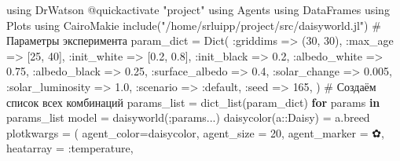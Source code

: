 \documentclass[
  english,
  russian,
  12pt,
  a4paper,
  DIV=11,
  numbers=noendperiod]{scrreprt}
\newenvironment{Shaded}{\begin{snugshade}}{\end{snugshade}}
\newcommand{\BuiltInTok}[1]{\textcolor[rgb]{0.00,0.23,0.31}{#1}}
\newcommand{\CharTok}[1]{\textcolor[rgb]{0.13,0.47,0.30}{#1}}
\newcommand{\CommentTok}[1]{\textcolor[rgb]{0.37,0.37,0.37}{#1}}
\newcommand{\ControlFlowTok}[1]{\textcolor[rgb]{0.00,0.23,0.31}{\textbf{#1}}}
\newcommand{\DataTypeTok}[1]{\textcolor[rgb]{0.68,0.00,0.00}{#1}}
\newcommand{\FloatTok}[1]{\textcolor[rgb]{0.68,0.00,0.00}{#1}}
\newcommand{\FunctionTok}[1]{\textcolor[rgb]{0.28,0.35,0.67}{#1}}
\newcommand{\ImportTok}[1]{\textcolor[rgb]{0.00,0.46,0.62}{#1}}
\newcommand{\KeywordTok}[1]{\textcolor[rgb]{0.00,0.23,0.31}{\textbf{#1}}}
\newcommand{\NormalTok}[1]{\textcolor[rgb]{0.00,0.23,0.31}{#1}}
\newcommand{\OperatorTok}[1]{\textcolor[rgb]{0.37,0.37,0.37}{#1}}
\newcommand{\PreprocessorTok}[1]{\textcolor[rgb]{0.68,0.00,0.00}{#1}}
\newcommand{\StringTok}[1]{\textcolor[rgb]{0.13,0.47,0.30}{#1}}
\begin{document}
\begin{Shaded}
\begin{Highlighting}[]
\ImportTok{using} \BuiltInTok{DrWatson}
\PreprocessorTok{@quickactivate} \StringTok{"project"}
\ImportTok{using} \BuiltInTok{Agents}
\ImportTok{using} \BuiltInTok{DataFrames}
\ImportTok{using} \BuiltInTok{Plots}
\ImportTok{using} \BuiltInTok{CairoMakie}
\FunctionTok{include}\NormalTok{(}\StringTok{"/home/srluipp/project/src/daisyworld.jl"}\NormalTok{)}
\CommentTok{\# Параметры эксперимента}
\NormalTok{param\_dict }\OperatorTok{=} \FunctionTok{Dict}\NormalTok{(}
\OperatorTok{:}\NormalTok{griddims }\OperatorTok{=\textgreater{}}\NormalTok{ (}\FloatTok{30}\NormalTok{, }\FloatTok{30}\NormalTok{),}
\OperatorTok{:}\NormalTok{max\_age }\OperatorTok{=\textgreater{}}\NormalTok{ [}\FloatTok{25}\NormalTok{, }\FloatTok{40}\NormalTok{],}
\OperatorTok{:}\NormalTok{init\_white }\OperatorTok{=\textgreater{}}\NormalTok{ [}\FloatTok{0.2}\NormalTok{, }\FloatTok{0.8}\NormalTok{],}
\OperatorTok{:}\NormalTok{init\_black }\OperatorTok{=\textgreater{}} \FloatTok{0.2}\NormalTok{,}
\OperatorTok{:}\NormalTok{albedo\_white }\OperatorTok{=\textgreater{}} \FloatTok{0.75}\NormalTok{,}
\OperatorTok{:}\NormalTok{albedo\_black }\OperatorTok{=\textgreater{}} \FloatTok{0.25}\NormalTok{,}
\OperatorTok{:}\NormalTok{surface\_albedo }\OperatorTok{=\textgreater{}} \FloatTok{0.4}\NormalTok{,}
\OperatorTok{:}\NormalTok{solar\_change }\OperatorTok{=\textgreater{}} \FloatTok{0.005}\NormalTok{,}
\OperatorTok{:}\NormalTok{solar\_luminosity }\OperatorTok{=\textgreater{}} \FloatTok{1.0}\NormalTok{,}
\OperatorTok{:}\NormalTok{scenario }\OperatorTok{=\textgreater{}} \OperatorTok{:}\NormalTok{default,}
\OperatorTok{:}\NormalTok{seed }\OperatorTok{=\textgreater{}} \FloatTok{165}\NormalTok{,}
\NormalTok{)}
\CommentTok{\# Создаём список всех комбинаций}
\NormalTok{params\_list }\OperatorTok{=} \FunctionTok{dict\_list}\NormalTok{(param\_dict)}
\ControlFlowTok{for}\NormalTok{ params }\KeywordTok{in}\NormalTok{ params\_list}
\NormalTok{model }\OperatorTok{=} \FunctionTok{daisyworld}\NormalTok{(;params}\OperatorTok{...}\NormalTok{)}
\FunctionTok{daisycolor}\NormalTok{(a}\OperatorTok{::}\DataTypeTok{Daisy}\NormalTok{) }\OperatorTok{=}\NormalTok{ a.breed}
\NormalTok{plotkwargs }\OperatorTok{=}\NormalTok{ (}
\NormalTok{agent\_color}\OperatorTok{=}\NormalTok{daisycolor,}
\NormalTok{agent\_size }\OperatorTok{=} \FloatTok{20}\NormalTok{,}
\NormalTok{agent\_marker }\OperatorTok{=} \CharTok{\textquotesingle{}✿\textquotesingle{}}\NormalTok{,}
\NormalTok{heatarray }\OperatorTok{=} \OperatorTok{:}\NormalTok{temperature,}

\end{Highlighting}
\end{Shaded}
\end{document}
